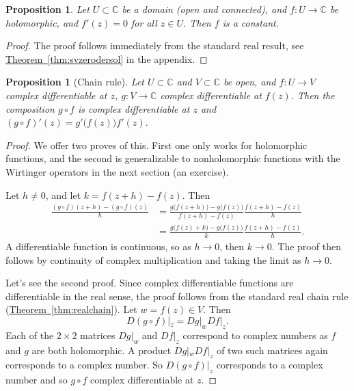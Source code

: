 \documentclass[12pt,openany]{book}
\newcommand{\C}{{\mathbb{C}}}
\theoremstyle{plain}
\newtheorem{prop}[thm]{Proposition}
\theoremstyle{remark}
\theoremstyle{definition}
\theoremstyle{exercise}
\theoremstyle{example}
\newcommand{\thmref}[1]{\hyperref[#1]{Theorem~\ref*{#1}}}
\begin{document}
\begin{prop} \label{prop:zeroder}
Let $U \subset \C$ be a domain (open and connected),
and $f \colon U \to \C$ be holomorphic, and $f'(z) = 0$ for all $z \in U$.
Then $f$ is a constant.
\end{prop}

\begin{proof}
The proof follows immediately from the standard real result,
see \thmref{thm:svzerodersol} in the appendix.
\end{proof}

\begin{prop}[Chain rule]
Let $U \subset \C$ and $V \subset \C$ be open, and $f \colon U \to V$
complex differentiable at $z$, $g \colon V \to \C$ complex differentiable
at $f(z)$.  Then the composition $g \circ f$
is complex differentiable at $z$ and $(g \circ f)'(z) = g'\bigl(f(z)\bigr) f'(z)$.
\end{prop}

\begin{proof}
We offer two proves of this.  First one only works for holomorphic
functions, and the second is generalizable to nonholomorphic functions
with the Wirtinger operators in the next section (an exercise).

Let $h \not= 0$, and let $k = f(z+h) -f(z)$.  Then
\begin{equation*}
\begin{split}
\frac{(g \circ f)(z+h) - (g \circ f)(z)}{h}
& =
\frac{g \bigl( f(z+h) \bigr) - g\bigl( f(z) \bigr)}{f(z+h)-f(z)}
\frac{f(z+h)-f(z)}{h}
\\
& =
\frac{g \bigl( f(z) + k \bigr) - g\bigl( f(z) \bigr)}{k}
\frac{f(z+h)-f(z)}{h} .
\end{split}
\end{equation*}
A differentiable function is continuous, so as $h \to 0$, then $k \to 0$.
The proof then follows by continuity of complex multiplication and taking
the limit as $h \to 0$.

Let's see the second proof.
Since complex differentiable functions are differentiable in the real sense,
the proof follows from the standard real chain rule (\thmref{thm:realchain}).
Let $w = f(z) \in V$.  Then
\begin{equation*}
D(g \circ f)|_z = Dg|_w Df|_z .
\end{equation*}
Each of the $2 \times 2$ matrices $Dg|_w$ and $Df|_z$ correspond to complex
numbers as $f$ and $g$ are both holomorphic.  A product $Dg|_w Df|_z$
of two such matrices again corresponds to a complex number.  So
$D(g \circ f)|_z$ corresponds to a complex number and so $g \circ f$
complex differentiable at $z$.
\end{proof}
\end{document}
